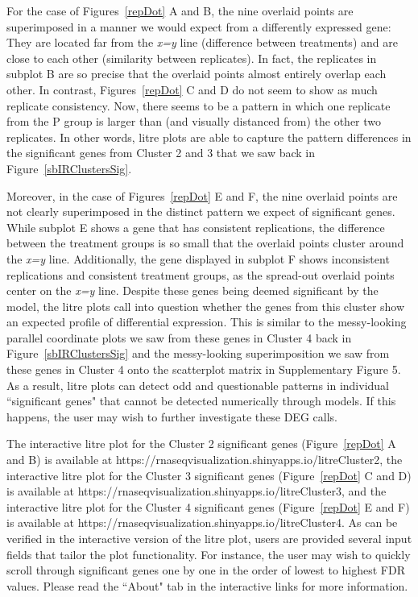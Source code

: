 \documentclass{bioinfo}
\begin{document}
For the case of Figures~\ref{repDot} A and B, the nine overlaid points are superimposed in a manner we would expect from a differently expressed gene: They are located far from the \textit{x=y} line (difference between treatments) and are close to each other (similarity between replicates). In fact, the replicates in subplot B are so precise that the overlaid points almost entirely overlap each other. In contrast, Figures~\ref{repDot} C and D do not seem to show as much replicate consistency. Now, there seems to be a pattern in which one replicate from the P group is larger than (and visually distanced from) the other two replicates. In other words, litre plots are able to capture the pattern differences in the significant genes from Cluster 2 and 3 that we saw back in Figure~\ref{sbIRClustersSig}.

Moreover, in the case of Figures~\ref{repDot} E and F, the nine overlaid points are not clearly superimposed in the distinct pattern we expect of significant genes. While subplot E shows a gene that has consistent replications, the difference between the treatment groups is so small that the overlaid points cluster around the \textit{x=y} line. Additionally, the gene displayed in subplot F shows inconsistent replications and consistent treatment groups, as the spread-out overlaid points center on the \textit{x=y} line. Despite these genes being deemed significant by the model, the litre plots call into question whether the genes from this cluster show an expected profile of differential expression. This is similar to the messy-looking parallel coordinate plots we saw from these genes in Cluster 4 back in Figure~\ref{sbIRClustersSig} and the messy-looking superimposition we saw from these genes in Cluster 4 onto the scatterplot matrix in Supplementary Figure 5. As a result, litre plots can detect odd and questionable patterns in individual ``significant genes" that cannot be detected numerically through models. If this happens, the user may wish to further investigate these DEG calls.

The interactive litre plot for the Cluster 2 significant genes (Figure~\ref{repDot} A and B) is available at https://rnaseqvisualization.shinyapps.io/litreCluster2, the interactive litre plot for the Cluster 3 significant genes (Figure~\ref{repDot} C and D) is available at https://rnaseqvisualization.shinyapps.io/litreCluster3, and the interactive litre plot for the Cluster 4 significant genes (Figure~\ref{repDot} E and F) is available at https://rnaseqvisualization.shinyapps.io/litreCluster4. As can be verified in the interactive version of the litre plot, users are provided several input fields that tailor the plot functionality. For instance, the user may wish to quickly scroll through significant genes one by one in the order of lowest to highest FDR values. Please read the ``About" tab in the interactive links for more information.
\end{document}
